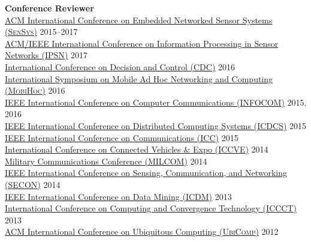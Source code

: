 {\bf Conference Reviewer}\\
{\href{http://sensys.acm.org}{ACM International Conference on Embedded Networked Sensor Systems (\textsc{SenSys})}} \hfill 2015--2017\\
{\href{http://ipsn.acm.org/2017/}{ACM/IEEE International Conference on Information Processing in Sensor Networks (\textsc{IPSN})}} \hfill 2017\\
{\href{http://cdc2016.ieeecss.org/}{International Conference on Decision and Control (\textsc{CDC})}} \hfill 2016\\
{\href{http://www.sigmobile.org/mobihoc/2016/}{International Symposium on Mobile Ad Hoc Networking and Computing (\textsc{MobiHoc})}} \hfill 2016\\
{\href{http://infocom2016.ieee-infocom.org/}{IEEE International Conference on Computer Communications (\textsc{INFOCOM})}} \hfill 2015, 2016\\
{\href{http://icdcs-2015.cse.ohio-state.edu/}{IEEE International Conference on Distributed Computing Systems (\textsc{ICDCS})}} \hfill 2015\\
{\href{http://icc2015.ieee-icc.org/}{IEEE International Conference on Communications (\textsc{ICC})}} \hfill 2015\\
{\href{http://www.iccve.org/2014/}{International Conference on Connected Vehicles \& Expo (\textsc{ICCVE})}} \hfill 2014\\
{\href{http://www.milcom.org/2014/}{Military Communications Conference (\textsc{MILCOM})}} \hfill 2014\\
{\href{http://secon2014.ieee-secon.org}{IEEE International Conference on Sensing, Communication, and Networking (\textsc{SECON})}} \hfill 2014\\
{\href{http://icdm2013.rutgers.edu}{IEEE International Conference on Data Mining (\textsc{ICDM})}} \hfill 2013\\
{\href{http://www.mnnit.ac.in/iccct2013}{International Conference on Computing and Convergence Technology (\textsc{ICCCT})}} \hfill 2013\\
{\href{http://www.ubicomp.org/ubicomp2012}{ACM International Conference on Ubiquitous Computing (\textsc{UbiComp})}} \hfill 2012\\
\vspace{-0.6cm}

